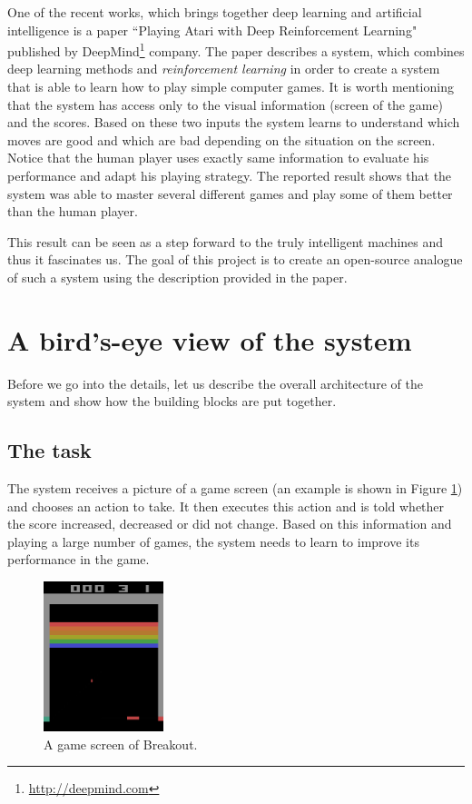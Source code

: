 \documentclass[a4paper,12pt]{article}
\begin{document}
One of the recent works, which brings together deep learning and artificial intelligence is a paper ``Playing Atari with Deep Reinforcement Learning"\cite{mnih2013playing} published by DeepMind\footnote{\url{http://deepmind.com}} company. The paper describes a system, which combines deep learning methods and \emph{reinforcement learning} in order to create a system that is able to learn how to play simple computer games. It is worth mentioning that the system has access only to the visual information (screen of the game) and the scores. Based on these two inputs the system learns to understand which moves are good and which are bad depending on the situation on the screen. Notice that the human player uses exactly same information to evaluate his performance and adapt his playing strategy. The reported result shows that the system was able to master several different games and play some of them better than the human player.

This result can be seen as a step forward to the truly intelligent machines and thus it fascinates us. The goal of this project is to create an open-source analogue of such a system using the description provided in the paper.



%
%
\pagebreak
\section{A bird's-eye view of the system}
Before we go into the details, let us describe the overall architecture of the system and show how the building blocks are put together. 

\subsection{The task}

The system receives a picture of a game screen (an example is shown in Figure \ref{fig:breakoutscreen}) and chooses an action to take. It then executes this action and is told whether the score increased, decreased or did not change. Based on this information and playing a large number of games, the system needs to learn to improve its performance in the game.

\begin{figure}[h]
\centering
\includegraphics[width=3.5cm]{fig_gamescreen}
\caption{A game screen of Breakout.}
\label{fig:breakoutscreen}
\end{figure}
\end{document}
